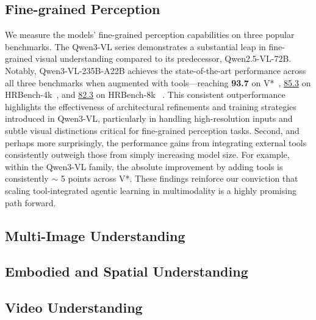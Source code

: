 \documentclass{article} %
\begin{document}
\subsection{Fine-grained Perception}
We measure the models' fine-grained perception capabilities on three popular benchmarks. The Qwen3-VL series demonstrates a substantial leap in fine-grained visual understanding compared to its predecessor, Qwen2.5-VL-72B. Notably, Qwen3-VL-235B-A22B achieves the state-of-the-art performance across all three benchmarks when augmented with tools—reaching \textbf{93.7} on V*~\citep{Wu_2024_CVPR}, \underline{85.3} on HRBench-4k~\citep{hrbench}, and \underline{82.3} on HRBench-8k ~\citep{hrbench}. This consistent outperformance highlights the effectiveness of architectural refinements and training strategies introduced in Qwen3-VL, particularly in handling high-resolution inputs and subtle visual distinctions critical for fine-grained perception tasks. Second, and perhaps more surprisingly, the performance gains from integrating external tools consistently outweigh those from simply increasing model size. For example, within the Qwen3-VL family, the absolute improvement by adding tools is consistently $\sim$ 5 points across V*. These findings reinforce our conviction that scaling tool-integrated agentic learning in multimodality is a highly promising path forward.

\subsection{Multi-Image Understanding}


\subsection{Embodied and Spatial Understanding}


\subsection{Video Understanding}


\end{document}
